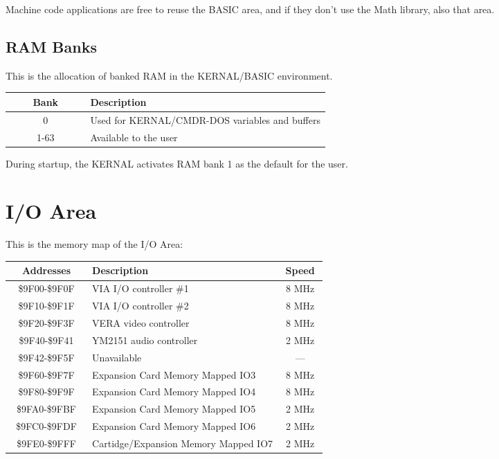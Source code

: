 \vspace{16pt}

Machine code applications are free to reuse the BASIC area, and if they don't use the Math library, also that area.

\subsection{RAM Banks}

This is the allocation of banked RAM in the KERNAL/BASIC environment.\\

\begin{tabular}{|c|p{0.75\linewidth}|}
	\hline
	{\bfseries Bank} & {\bfseries Description}\\ \hline
	0     & Used for KERNAL/CMDR-DOS variables and buffers\\ \hline
	1-63 & Available to the user\\ \hline
\end{tabular}

\vspace{16pt}

During startup, the KERNAL activates RAM bank 1 as the default for the user.\\

\section{I/O Area}

This is the memory map of the I/O Area:\\

\begin{tabular}{|c|p{0.60\linewidth}|c|}
	\hline
	{\bfseries Addresses} & {\bfseries Description} & {\bfseries Speed}\\ \hline
	\$9F00-\$9F0F & VIA I/O controller \#1                 & 8 MHz\\ \hline
	\$9F10-\$9F1F & VIA I/O controller \#2                 & 8 MHz\\ \hline
	\$9F20-\$9F3F & VERA video controller                 & 8 MHz\\ \hline
	\$9F40-\$9F41 & YM2151 audio controller               & 2 MHz\\ \hline
	\$9F42-\$9F5F & Unavailable                           &  --- \\ \hline
	\$9F60-\$9F7F & Expansion Card Memory Mapped IO3      & 8 MHz\\ \hline
	\$9F80-\$9F9F & Expansion Card Memory Mapped IO4      & 8 MHz\\ \hline
	\$9FA0-\$9FBF & Expansion Card Memory Mapped IO5      & 2 MHz\\ \hline
	\$9FC0-\$9FDF & Expansion Card Memory Mapped IO6      & 2 MHz\\ \hline
	\$9FE0-\$9FFF & Cartidge/Expansion Memory Mapped IO7  & 2 MHz\\ \hline
\end{tabular}

